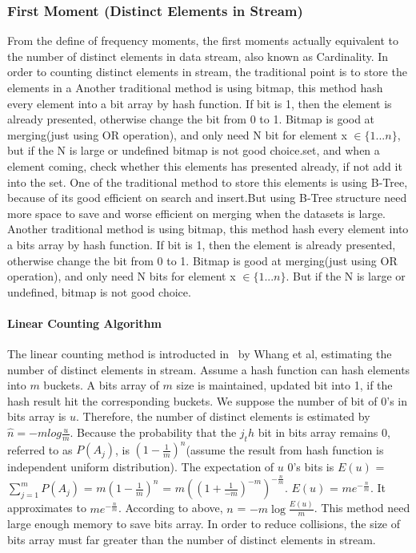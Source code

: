 \subsubsection{First Moment (Distinct Elements in Stream)}
From the define of frequency moments, the first moments actually equivalent to
the number of distinct elements in data stream, also known as Cardinality. In
order to counting distinct elements in stream, the traditional point is to store
the elements in a Another traditional method is using bitmap, this method hash
every element into a bit array by hash function. If bit is 1, then the element
is already presented, otherwise change the bit from 0 to 1. Bitmap is good at
merging(just using OR operation), and only need N bit for element x $\in
\{1...n\}$, but if the N is large or undefined bitmap is not good choice.set,
and when a element coming, check whether this elements has presented already, if
not add it into the set. One of the traditional method to store this elements is
using B-Tree, because of its good efficient on search and insert.But using
B-Tree structure need more space to save and worse efficient on merging when the
datasets is large. Another traditional method is using bitmap, this method hash
every element into a bits array by hash function. If bit is 1, then the element
is already presented, otherwise change the bit from 0 to 1. Bitmap is good at
merging(just using OR operation), and only need N bits for element x $\in
\{1...n\}$. But if the N is large or undefined, bitmap is not good choice.

\paragraph{Linear Counting Algorithm}

The linear counting method is introducted in~\cite{whang1990linear} by Whang et
al, estimating the number of distinct elements in stream. Assume a hash function
can hash elements into $m$ buckets. A bits array of $m$ size is maintained,
updated bit into 1, if the hash result hit the corresponding buckets. We suppose
the number of bit of 0's in bits array is $u$. Therefore, the number of distinct
elements is estimated by $\hat{n} = -mlog\frac{u}{m}$. Because the probability
that the $j_th$ bit in bits array remains 0, referred to as $P(A_j)$, is
$(1-\frac{1}{m})^n$(assume the result from hash function is independent uniform
distribution). The expectation of $u$ 0's bits is $E(u)$ = $\sum_{j=1}^{m}
P(A_j)$ = $m(1-\frac{1}{m})^n$ = $m((1+\frac{1}{-m})^{-m})^{-\frac{n}{m}}$.
$E(u)$ = $me^{-\frac{n}{m}} $. It approximates to $me^{-\frac{n}{m}}$. According
to above, $n$ = $-m\log{\frac{E(u)}{m}}$. This method need large enough memory
to save bits array. In order to reduce collisions, the size of bits array must
far greater than the number of distinct elements in stream.

